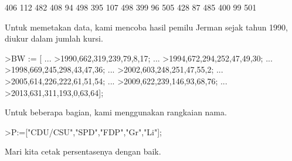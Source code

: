 \documentclass{article}
\begin{document}
\begin{eulernotebook}
\begin{eulercomment}
\begin{eulercomment}
\begin{euleroutput}
            406           112           482 
            408            94           498 
            395           107           498 
            399            96           505 
            428            87           485 
            400            99           501 
\end{euleroutput}
\begin{eulercomment}
Untuk memetakan data, kami mencoba hasil pemilu Jerman sejak tahun
1990, diukur dalam jumlah kursi.
\end{eulercomment}
\begin{eulerprompt}
>BW := [ ...
>1990,662,319,239,79,8,17; ...
>1994,672,294,252,47,49,30; ...
>1998,669,245,298,43,47,36; ...
>2002,603,248,251,47,55,2; ...
>2005,614,226,222,61,51,54; ...
>2009,622,239,146,93,68,76; ...
>2013,631,311,193,0,63,64];
\end{eulerprompt}
\begin{eulercomment}
Untuk beberapa bagian, kami menggunakan rangkaian nama.
\end{eulercomment}
\begin{eulerprompt}
>P:=["CDU/CSU","SPD","FDP","Gr","Li"];
\end{eulerprompt}
\begin{eulercomment}
Mari kita cetak persentasenya dengan baik.


\end{eulercomment}
\end{eulercomment}
\end{eulercomment}
\end{eulernotebook}
\end{document}
